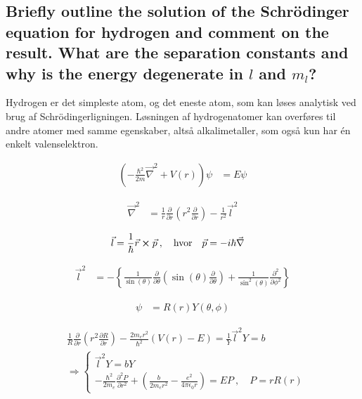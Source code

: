 \subsection{Briefly outline the solution of the Schrödinger equation for hydrogen and comment on the result. What are the separation constants and why is the energy degenerate in $l$ and $m_l$?}


Hydrogen er det simpleste atom, og det eneste atom, som kan løses analytisk ved brug af Schrödingerligningen. Løsningen af hydrogenatomer kan overføres til andre atomer med samme egenskaber, altså alkalimetaller, som også kun har én enkelt valenselektron.



\begin{align}
    \left(-\frac{\hbar^2}{2m}\Vec{\nabla}^2 + V(r)\right)\psi &= E\psi
\end{align}

\begin{align}
    \Vec{\nabla}^2 &= \frac{1}{r} \frac{\partial}{\partial r}\left(r^2 \frac{\partial}{\partial r}\right) - \frac{1}{r^2}\Vec{l}^2
\end{align}

\begin{align}
    \Vec{l} &= \frac{1}{\hbar} \Vec{r} \cross \Vec{p} \: , \quad \text{hvor} \quad \Vec{p} = -i\hbar\Vec{\nabla}
\end{align}

\begin{align}
    \Vec{l}^2 &= -\left\{\frac{1}{\sin(\theta)}\frac{\partial}{\partial \theta}\left(\sin(\theta)\frac{\partial}{\partial \theta}\right) + \frac{1}{\sin^2(\theta)}\frac{\partial^2}{\partial \phi^2}\right\}
\end{align}

\begin{align}
    \psi &= R(r)Y(\theta,\phi)
\end{align}

\begin{align}
    &\frac{1}{R}\frac{\partial}{\partial r} \left(r^2 \frac{\partial R}{\partial r}\right) - \frac{2m_er^2}{\hbar^2}\left(V(r) - E\right) = \frac{1}{Y}\Vec{l}^2Y = b \\
    &\Rightarrow \begin{cases}
        \Vec{l}^2Y = bY \\
        -\frac{\hbar^2}{2m_e} \frac{\partial^2P}{\partial r^2} + \left(\frac{b}{2m_er^2} - \frac{e^2}{4\pi\epsilon_0 r}\right) = EP \: , \quad P = rR(r)
    \end{cases}
\end{align}